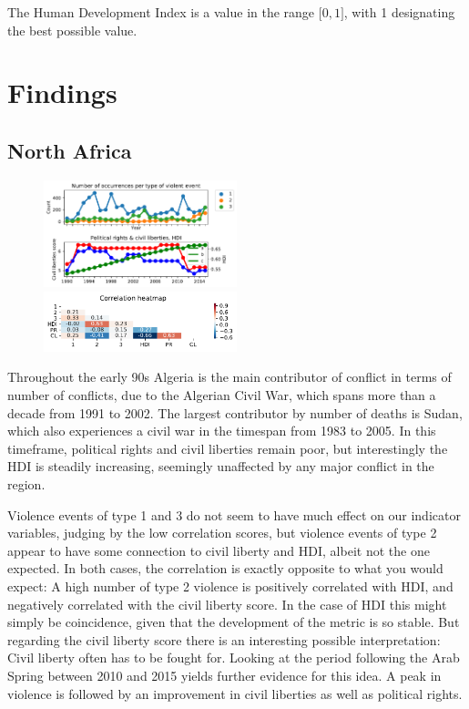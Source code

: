 \documentclass[a4paper,11pt]{article}
\begin{document}
The Human Development Index is a value in the range ${[}0,1{]}$, with 1 designating
the best possible value.

\section{Findings}

\subsection{North Africa}
\begin{figure}[ht!]
    \includegraphics[width=0.50\textwidth]{images/na.pdf}
    \includegraphics[width=0.50\textwidth]{images/na_corr.pdf}
\end{figure}
Throughout the early 90s Algeria is the main contributor of conflict in terms of number of conflicts, due to the Algerian Civil War, which spans more than a decade from 1991 to 2002. The largest contributor by number of deaths is Sudan, which also experiences a civil war in the timespan from 1983 to 2005. In this timeframe, political rights and civil liberties remain poor, but interestingly the HDI is steadily increasing, seemingly unaffected by any major conflict in the region.

Violence events of type 1 and 3 do not seem to have much effect on our indicator variables, judging by the low correlation scores, but violence events of type 2 appear to have some connection to civil liberty and HDI, albeit not the one expected. In both cases, the correlation is exactly opposite to what you would expect: A high number of type 2 violence is positively correlated with HDI, and negatively correlated with the civil liberty score. In the case of HDI this might simply be coincidence, given that the development of the metric is so stable. But regarding the civil liberty score there is an interesting possible interpretation: Civil liberty often has to be fought for. Looking at the period following the Arab Spring between 2010 and 2015 yields further evidence for this idea. A peak in violence is followed by an improvement in civil liberties as well as political rights.
\end{document}
